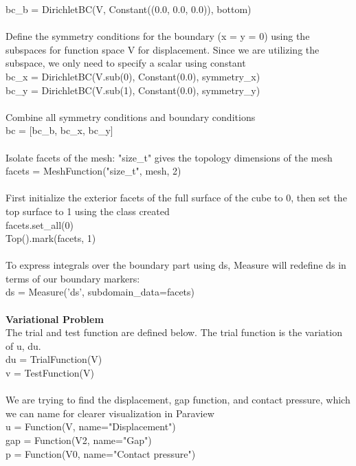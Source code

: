 \documentclass[12pt,3p]{article}
\begin{document}
{\selectfont
bc\_b = DirichletBC(V, Constant((0.0, 0.0, 0.0)), bottom) \\ \\
}
Define the symmetry conditions for the boundary (x = y = 0) using the subspaces for function space V for displacement. Since we are utilizing the subspace, we only need to specify a scalar using constant \\
{\selectfont
bc\_x = DirichletBC(V.sub(0), Constant(0.0), symmetry\_x) \\
bc\_y = DirichletBC(V.sub(1), Constant(0.0), symmetry\_y) \\ \\
}
Combine all symmetry conditions and boundary conditions \\
{\selectfont
bc = [bc\_b, bc\_x, bc\_y] \\ \\
}
Isolate facets of the mesh: {\selectfont "size\_t"} gives the topology dimensions of the mesh  \\
{\selectfont
facets = MeshFunction("size\_t", mesh, 2) \\ \\ 
}
First initialize the exterior facets of the full surface of the cube to 0, then set the top surface to 1 using the class created \\
{\selectfont
facets.set\_all(0) \\ 
Top().mark(facets, 1) \\ \\
}
To express integrals over the boundary part using ds, {\selectfont Measure} will redefine ds in terms of our boundary markers: \\
{\selectfont
ds = Measure('ds', subdomain\_data=facets) \\ \\
}
\textbf{Variational Problem} \\
The trial and test function are defined below. The trial function is the variation of u, du. \\
{\selectfont
du = TrialFunction(V)      \\
v = TestFunction(V)          \\   \\
}
We are trying to find the displacement, gap function, and contact pressure, which we can name for clearer visualization in Paraview \\
{\selectfont
u = Function(V, name="Displacement")   \\
gap = Function(V2, name="Gap") \\
p = Function(V0, name="Contact pressure") \\ \\
}
\end{document}
